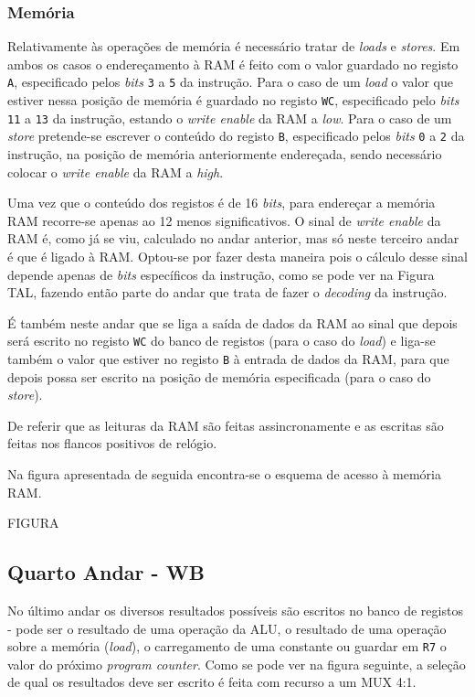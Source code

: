 \documentclass[11pt]{article}
\numberwithin{equation}{section}
\begin{document}
\subsubsection{Memória}
Relativamente às operações de memória é necessário tratar de \textit{loads} e \textit{stores}. Em ambos os casos o endereçamento à RAM é feito com o valor guardado no registo \texttt{A}, especificado pelos \textit{bits} \texttt{3} a \texttt{5} da instrução. Para o caso de um \textit{load} o valor que estiver nessa posição de memória é guardado no registo \texttt{WC}, especificado pelo \textit{bits} \texttt{11} a \texttt{13} da instrução, estando o \textit{write enable} da RAM a \textit{low}. Para o caso de um \textit{store} pretende-se escrever o conteúdo do registo \texttt{B}, especificado pelos \textit{bits} \texttt{0} a \texttt{2} da instrução, na posição de memória anteriormente endereçada, sendo necessário colocar o \textit{write enable} da RAM a \textit{high}. 

Uma vez que o conteúdo dos registos é de 16 \textit{bits}, para endereçar a memória RAM recorre-se apenas ao 12 menos significativos. O sinal de \textit{write enable} da RAM é, como já se viu, calculado no andar anterior, mas só neste terceiro andar é que é ligado à RAM. Optou-se por fazer desta maneira pois o cálculo desse sinal depende apenas de \textit{bits} específicos da instrução, como se pode ver na Figura TAL, fazendo então parte do andar que trata de fazer o \textit{decoding} da instrução.

É também neste andar que se liga a saída de dados da RAM ao sinal que depois será escrito no registo \texttt{WC} do banco de registos (para o caso do \textit{load}) e liga-se também o valor que estiver no registo \texttt{B} à entrada de dados da RAM, para que depois possa ser escrito na posição de memória especificada (para o caso do \textit{store}).

De referir que as leituras da RAM são feitas assincronamente e as escritas são feitas nos flancos positivos de relógio. 

Na figura apresentada de seguida encontra-se o esquema de acesso à memória RAM.

FIGURA

\subsection{Quarto Andar - WB}

No último andar os diversos resultados possíveis são escritos no banco de registos - pode ser o resultado de uma operação da ALU, o resultado de uma operação sobre a memória (\textit{load}), o carregamento de uma constante ou guardar em \texttt{R7} o valor do próximo \textit{program counter}. Como se pode ver na figura seguinte, a seleção de qual os resultados deve ser escrito é feita com recurso a um MUX 4:1. 
\end{document}
